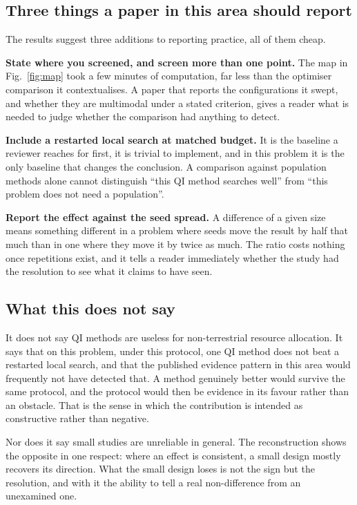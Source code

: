 \documentclass[runningheads]{llncs}
\begin{document}
\subsection{Three things a paper in this area should report}

The results suggest three additions to reporting practice, all of them cheap.

\textbf{State where you screened, and screen more than one point.} The map in Fig.~\ref{fig:map}
took a few minutes of computation, far less than the optimiser comparison it contextualises. A
paper that reports the configurations it swept, and whether they are multimodal under a stated
criterion, gives a reader what is needed to judge whether the comparison had anything to detect.

\textbf{Include a restarted local search at matched budget.} It is the baseline a reviewer
reaches for first, it is trivial to implement, and in this problem it is the only baseline that
changes the conclusion. A comparison against population methods alone cannot distinguish ``this
QI method searches well'' from ``this problem does not need a population''.

\textbf{Report the effect against the seed spread.} A difference of a given size means something
different in a problem where seeds move the result by half that much than in one where they move
it by twice as much. The ratio costs nothing once repetitions exist, and it tells a reader
immediately whether the study had the resolution to see what it claims to have seen.

\subsection{What this does not say}

It does not say QI methods are useless for non-terrestrial resource allocation. It says that on
this problem, under this protocol, one QI method does not beat a restarted local search, and that
the published evidence pattern in this area would frequently not have detected that. A method
genuinely better would survive the same protocol, and the protocol would then be evidence in its
favour rather than an obstacle. That is the sense in which the contribution is intended as
constructive rather than negative.

Nor does it say small studies are unreliable in general. The reconstruction shows the opposite in
one respect: where an effect is consistent, a small design mostly recovers its direction. What
the small design loses is not the sign but the resolution, and with it the ability to tell a real
non-difference from an unexamined one.
\end{document}
